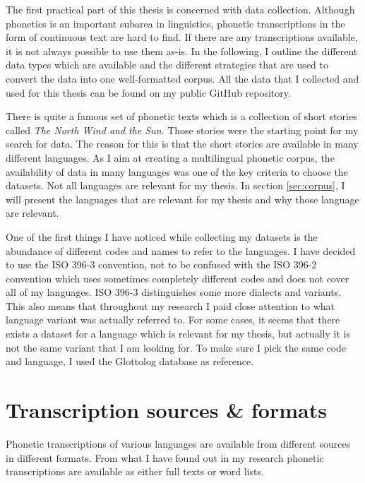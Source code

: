 \label{chap:data_collection}
The first practical part of this thesis is concerned with data collection. Although phonetics is an important subarea in linguistics, phonetic transcriptions in the form of continuous text are hard to find. If there are any transcriptions available, it is not always possible to use them as-is. In the following, I outline the different data types which are available and the different strategies that are used to convert the data into one well-formatted corpus. All the data that I collected and used for this thesis can be found on my public GitHub repository. 

There is quite a famous set of phonetic texts which is a collection of short stories called \textit{The North Wind and the Sun}. Those stories were the starting point for my search for data. The reason for this is that the short stories are available in many different languages. As I aim at creating a multilingual phonetic corpus, the availability of data in many languages was one of the key criteria to choose the datasets. Not all languages are relevant for my thesis. In section \ref{sec:corpus}, I will present the languages that are relevant for my thesis and why those language are relevant.

One of the first things I have noticed while collecting my datasets is the abundance of different codes and names to refer to the languages. I have decided to use the ISO 396-3 convention, not to be confused with the ISO 396-2 convention which uses sometimes completely different codes and does not cover all of my languages. ISO 396-3 distinguishes some more dialects and variants. This also means that throughout my research I paid close attention to what language variant was actually referred to. For some cases, it seems that there exists a dataset for a language which is relevant for my thesis, but actually it is not the same variant that I am looking for. To make sure I pick the same code and language, I used the Glottolog database as reference.


\section{Transcription sources \& formats}
Phonetic transcriptions of various languages are available from different sources in different formats. From what I have found out in my research phonetic transcriptions are available as either full texts or word lists.

